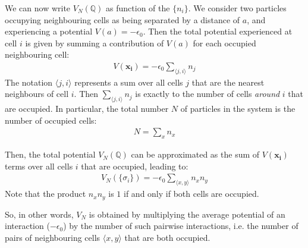 \documentclass[../template.tex]{subfiles}
\begin{document}

We can now write $V_N(\mathbb{Q})$ as function of the $\{n_i\}$. We consider two particles occupying neighbouring cells as being separated by a distance of $a$, and experiencing a potential $V(a) = -\epsilon_0$. Then the total potential experienced at cell $i$ is given by summing a contribution of $V(a)$ for each occupied neighbouring cell:
\begin{align*}
    V(\bm{x_i}) = - \epsilon_0\sum_{\langle j,i \rangle} n_j
\end{align*}
The notation $\langle j,i \rangle$ represents a sum over all cells $j$ that are the nearest neighbours of cell $i$. Then $\sum_{\langle j,i \rangle} n_j$ is exactly to the number of cells \textit{around} $i$ that are occupied. In particular, the total number $N$ of particles in the system is the number of occupied cells:
\begin{align}\label{eqn:num-particles1}
    N = \sum_x n_x
\end{align}

\medskip

Then, the total potential $V_N(\mathbb{Q})$ can be approximated as the sum of $V(\bm{x_i})$ terms over all cells $i$ that are occupied, leading to:
\begin{align}\label{eqn:total-pot1}
    V_N(\{\sigma_i\}) = - \epsilon_0 \sum_{\langle x,y \rangle} n_x n_y
\end{align}
Note that the product $n_x n_y$ is $1$ if and only if both cells are occupied.

So, in other words, $V_N$ is obtained by multiplying the average potential of an interaction ($-\epsilon_0$) by the number of such pairwise interactions, i.e. the number of pairs of neighbouring cells $\langle x,y\rangle$ that are both occupied.
\end{document}
